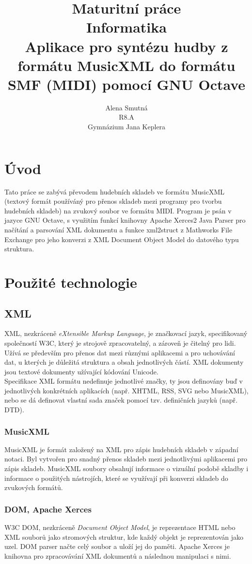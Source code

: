 \documentclass[12pt,a4paper,titlepage]{article}
\title{\huge{Maturitní práce}\\
\large{Informatika}\\
\Large{Aplikace pro syntézu hudby z formátu MusicXML do formátu SMF (MIDI) pomocí GNU Octave}}
\author{Alena Smutná\\
	R8.A\\
	Gymnázium Jana Keplera\\}
\begin{document}
	\renewcommand{\refname}{Literatura}
\maketitle
\tableofcontents
\newpage
\section{Úvod}
Tato práce se zabývá převodem hudebních skladeb ve formátu MusicXML (textový formát používáný pro přenos skladeb mezi programy pro tvorbu hudebních skladeb) na zvukový soubor ve formátu MIDI. Program je psán v jazyce GNU Octave, s využitím funkcí knihovny Apache Xerces2 Java Parser pro načítání a parsování XML dokumentu a funkce xml2struct z Mathworks File Exchange pro jeho konverzi z XML Document Object Model do datového typu struktura.
\section{Použité technologie}
\subsection{XML}
XML, nezkráceně \emph{eXtensible Markup Language}, je značkovací jazyk, specifikovaný společností W3C, který je strojově zpracovatelný, a zároveň je čitelný pro lidi. Užívá se především pro přenos dat mezi různými aplikacemi a pro uchovávání dat, u kterých je důležitá struktura a obsah jednotlivých částí. XML dokumenty jsou textové dokumenty užívající kódování Unicode.
\\
Specifikace XML formátu nedefinuje jednotlivé značky, ty jsou definovány buď v jednotlivých konkrétních aplikacích (např. XHTML, RSS, SVG nebo MusicXML), nebo se dá definovat vlastní sada značek pomocí tzv. definičních jazyků (např. DTD). 
\subsubsection{MusicXML}
MusicXML je formát založený na XML pro zápis hudebních skladeb v západní notaci. Byl vytvořen pro snadný přenos skladeb mezi jednotlivými aplikacemi pro zápis skladeb. MusicXML soubory obsahují informace o vizuální podobě skladby i informace o použitých nástrojích, které se využívají při konverzi skladeb do zvukových formátů.
\subsubsection{DOM, Apache Xerces}
W3C DOM, nezkráceně \emph{Document Object Model}, je reprezentace HTML nebo XML souborů jako stromových struktur, kde každý objekt je reprezentován jako uzel. DOM parser načte celý soubor a uloží jej do paměti. Apache Xerces je knihovna pro zpracovávání XML dokumentů a následnou manipulaci s nimi.
\end{document}

